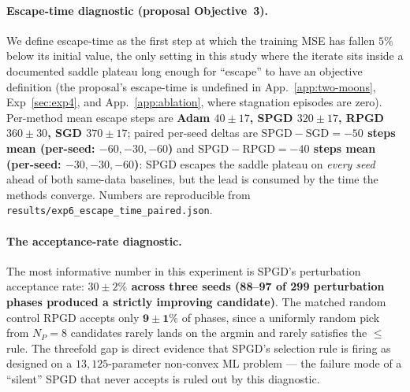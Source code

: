 \documentclass[11pt]{article}
\newcommand{\np}{\ensuremath{N_P}}
\begin{document}
\paragraph{Escape-time diagnostic (proposal Objective~3).}
We define escape-time as the first step at which the training MSE has
fallen $5\%$ below its initial value, the only setting in this study
where the iterate sits inside a documented saddle plateau long enough
for ``escape'' to have an objective definition (the proposal's
escape-time is undefined in App.~\ref{app:two-moons},
Exp~\ref{sec:exp4}, and App.~\ref{app:ablation}, where stagnation
episodes are zero).  Per-method
mean escape steps are
\textbf{Adam $40 \pm 17$, SPGD $320 \pm 17$, RPGD $360 \pm 30$, SGD
$370 \pm 17$}; paired per-seed deltas are
\textbf{$\mathrm{SPGD} - \mathrm{SGD} = -50$ steps mean (per-seed:
$-60, -30, -60$)} and
\textbf{$\mathrm{SPGD} - \mathrm{RPGD} = -40$ steps mean (per-seed:
$-30, -30, -60$)}: SPGD escapes the saddle plateau on \emph{every
seed} ahead of both same-data baselines, but the lead is consumed by
the time the methods converge.  Numbers are reproducible from
\texttt{results/exp6\_escape\_time\_paired.json}.

\paragraph{The acceptance-rate diagnostic.}
The most informative number in this experiment is SPGD's
perturbation acceptance rate:
\textbf{$30 \pm 2\%$ across three seeds (88--97 of 299 perturbation
phases produced a strictly improving candidate)}.  The matched random
control RPGD accepts only $\bm{9 \pm 1\%}$ of phases, since a
uniformly random pick from $\np{=}8$ candidates rarely lands on the
argmin and rarely satisfies the $\le$ rule.  The threefold gap is
direct evidence that SPGD's selection rule is firing as designed on a
$13{,}125$-parameter non-convex ML problem --- the failure mode of a
``silent'' SPGD that never accepts is ruled out by this diagnostic.
\end{document}
